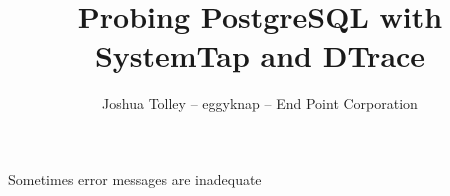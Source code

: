 \documentclass{beamer}
\begin{document}
\title{Probing PostgreSQL with SystemTap and DTrace}
\author{Joshua Tolley -- eggyknap -- End Point Corporation
}


\frame{\titlepage}

\begin{frame}
    Sometimes error messages are inadequate
    \begin{figure}[b]
    \begin{centering}
    \end{centering}
    \end{figure}
\end{frame}
\end{document}

